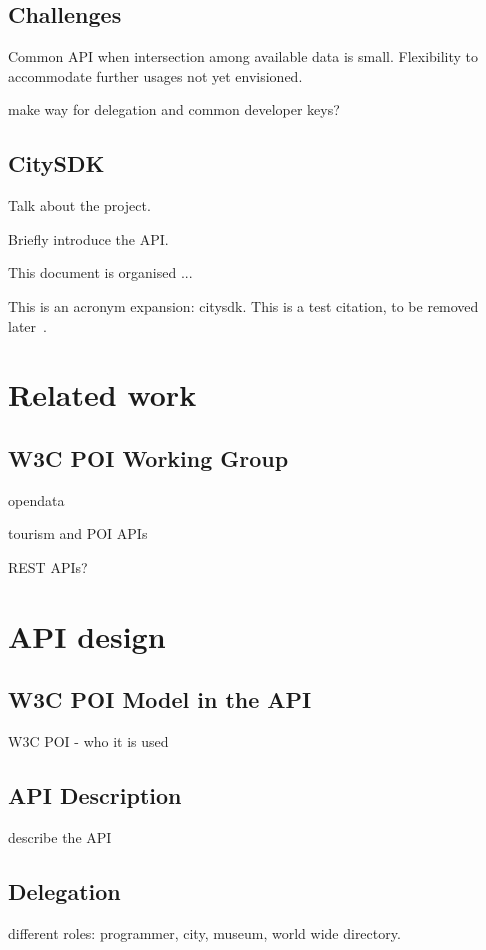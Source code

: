 \documentclass[times]{ettauth}
\begin{document}
\subsection{Challenges}
Common API when intersection among available data is small.
Flexibility to accommodate further usages not yet envisioned.

make way for delegation and common developer keys?


\subsection{CitySDK}
Talk about the project.

Briefly introduce the API.

This document is organised ...

This is an acronym expansion: \ac{citysdk}.
This is a test citation, to be removed later~\cite{1509968}.



\section{Related work}

\subsection{W3C POI Working Group}

opendata

tourism and POI APIs

REST APIs?


\section{API design}

\subsection{W3C POI Model in the API}
W3C POI - who it is used

\subsection{API Description}
describe the API

\subsection{Delegation}
different roles: programmer, city, museum, world wide directory.
\end{document}
